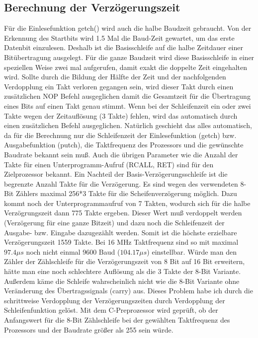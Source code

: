 \subsection{Berechnung der Verzögerungszeit}
Für die Einlesefunktion getch() wird auch die halbe Baudzeit  gebraucht.
Von der Erkennung des Startbits wird 1.5 Mal die Baud-Zeit gewartet, um das erste Datenbit
einzulesen.
Deshalb ist die Basisschleife auf die halbe Zeitdauer einer Bitübertragung ausgelegt.
Für die ganze Baudzeit wird diese Basisschleife in einer speziellen Weise zwei mal aufgerufen,
damit exakt die doppelte Zeit eingehalten wird. Sollte durch die Bildung der Hälfte der Zeit und der
nachfolgenden Verdopplung ein Takt verloren gegangen sein, wird dieser Takt durch einen zusätzlichen
NOP Befehl ausgeglichen damit die Gesamtzeit für die Übertragung eines Bits auf einen Takt genau stimmt.
Wenn bei der Schleifenzeit ein oder zwei Takte wegen der Zeitauflösung (3 Takte) fehlen,
wird das automatisch durch einen zusätzlichen Befehl ausgeglichen.
Natürlich geschieht das alles automatisch, da für die Berechnung nur die Schleifenzeit der Einlesefunktion
(getch) bzw. Ausgabefunktion (putch), die Taktfrequenz des Prozessors und die gewünschte Baudrate
bekannt sein muß. Auch die übrigen Parameter wie die Anzahl der Takte für einen Unterprogramm-Aufruf
(RCALL, RET) sind für den Zielprozessor bekannt.
Ein Nachteil der Basis-Verzögerungsschleife ist die begrenzte Anzahl Takte für die Verzögerung.
Es sind wegen des verwendeten 8-Bit Zählers maximal 256*3 Takte für die Scheifenverzögerung möglich.
Dazu kommt noch der Unterprogrammaufruf von 7 Takten, wodurch sich für die halbe Verzögrungszeit dann 775 Takte ergeben.
Dieser Wert muß verdoppelt werden (Verzögerung für eine ganze Bitzeit) und dazu noch die Schleifenzeit der
Ausgabe- bzw. Eingabe dazugezählt werden. Somit ist die höchste erzielbare Verzögerungszeit 1559 Takte.
Bei 16 MHz Taktfrequenz sind so mit maximal \(97.4\mu s\) noch nicht einmal 9600 Baud (\(104.17 \mu s\)) einstellbar.
Würde man den Zähler der Zählschleife für die Verzögerungszeit von 8 Bit auf 16 Bit erweitern,
hätte man eine noch schlechtere Auflösung als die 3 Takte der 8-Bit Variante.
Außerdem käme die Schleife wahrscheinlich nicht wie die 8-Bit Variante ohne Veränderung des Übertragssignals (carry) aus.
Dieses Problem habe ich durch die schrittweise Verdopplung der Verzögerungszeiten durch Verdopplung der
Schleifenfunktion gelöst. Mit dem C-Preprozessor wird geprüft, ob der Anfangswert für die 8-Bit Zählschleife
bei der gewählten Taktfrequenz des Prozessors und der Baudrate größer als 255 sein würde.
